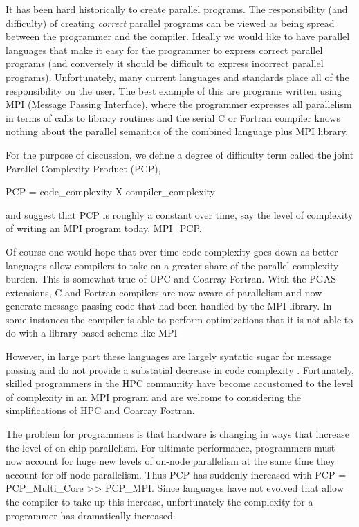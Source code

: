 It has been hard historically to create parallel programs.  The responsibility
(and difficulty) of creating \emph{correct} parallel programs can be viewed as
being spread between the programmer and the compiler.
Ideally we would like to have parallel languages that make it easy for the
programmer to express correct parallel programs (and conversely it should be difficult to express
incorrect parallel programs).  Unfortunately, many current languages and
standards place all of the responsibility on the user.  The best example of this
are programs written using MPI (Message Passing Interface), where the programmer
expresses all parallelism in terms of calls to library routines and the serial C or Fortran
compiler knows nothing about the parallel semantics of the combined language
plus MPI library.

For the purpose of discussion, we define a degree of difficulty term called the
joint Parallel Complexity Product (PCP),

    PCP = code\_complexity X compiler\_complexity

and suggest that PCP is roughly a constant over time, say the level of
complexity of writing an MPI program today, MPI\_PCP.

Of course one would hope that over time code complexity goes down as better
languages allow compilers to take on a greater share of the parallel complexity
burden.  This is somewhat true of UPC and Coarray Fortran.  With the PGAS
extensions, C and Fortran compilers are now aware of parallelism and now
generate message passing code that had been handled by the MPI library.  In some
instances the compiler is able to perform optimizations that it is not able to
do with a library based scheme like MPI \cite{CrayPGASPaper}


However, in large part these languages are largely syntatic sugar for message
passing and do not provide a substatial decrease in code complexity
\cite{CAF_MPI_PGAS_COMPARISON}.  Fortunately, skilled programmers in the HPC
community have become accustomed to the level of complexity in an MPI program
and are welcome to considering the simplifications of HPC and Coarray Fortran.

The problem for programmers is that hardware is changing in ways that increase
the level of on-chip parallelism.  For ultimate performance, programmers must now
account for huge new levels of on-node parallelism at the same time they account
for off-node parallelism.  Thus PCP has suddenly increased with PCP = PCP\_Multi\_Core >> PCP\_MPI.
Since languages have not evolved that allow the compiler to take up this increase, unfortunately the
complexity for a programmer has dramatically increased.

